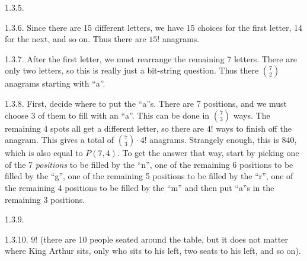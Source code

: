 \begin {itemize}
\begin{ans}{1.3.5.}
  
\end{ans}
\begin{ans}{1.3.6.}
		Since there are 15 different letters, we have 15 choices for the first letter, 14 for the next, and so on.  Thus there are $15!$ anagrams.
	
\end{ans}
\begin{ans}{1.3.7.}
	 After the first letter, we must rearrange the remaining 7 letters.  There are only two letters, so this is really just a bit-string question.  Thus there ${7 \choose 2}$ anagrams starting with ``a''.
	
\end{ans}
\begin{ans}{1.3.8.}
		First, decide where to put the ``a''s.  There are 7 positions, and we must choose 3 of them to fill with an ``a''.  This can be done in ${7 \choose 3}$ ways.  The remaining 4 spots all get a different letter, so there are $4!$ ways to finish off the anagram.  This gives a total of ${7 \choose 3}\cdot 4!$ anagrams.  Strangely enough, this is 840, which is also equal to $P(7,4)$.  To get the answer that way, start by picking one of the 7 \emph{positions} to be filled by the ``n'', one of the remaining 6 positions to be filled by the ``g'', one of the remaining 5 positions to be filled by the ``r'', one of the remaining 4 positions to be filled by the ``m'' and then put ``a''s in the remaining 3 positions.
	
\end{ans}
\begin{ans}{1.3.9.}
  
\end{ans}
\begin{ans}{1.3.10.}
     $9!$ (there are 10 people seated around the table, but it does not matter where King Arthur sits, only who sits to his left, two seats to his left, and so on).
  
\end{ans}
\protect \end {itemize}

